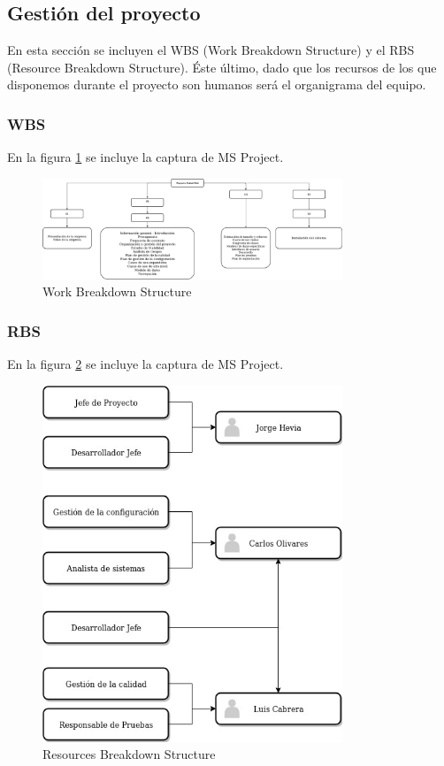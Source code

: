 \subsection{Gestión del proyecto}
\par En esta sección se incluyen el WBS (Work Breakdown Structure) y el RBS (Resource Breakdown Structure). Éste último, dado que los recursos de los que disponemos durante el proyecto son humanos será el organigrama del equipo.

\subsubsection{WBS}
\par En la figura \ref{fig:wbs} se incluye la captura de MS Project.
\begin{figure}
  \centering
    \includegraphics[width=0.8\textwidth]{img/WBS.jpeg}
  \caption{Work Breakdown Structure}
  \label{fig:wbs}
\end{figure}


\subsubsection{RBS}
\par En la figura \ref{fig:rbs} se incluye la captura de MS Project.
\begin{figure}
  \centering
    \includegraphics[width=0.8\textwidth]{img/RBS.jpeg}
  \caption{Resources Breakdown Structure}
  \label{fig:rbs}
\end{figure}
